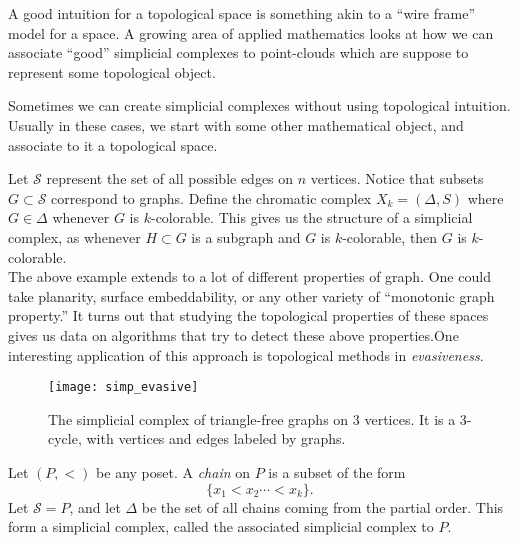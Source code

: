 A good intuition for a topological space is something akin to a ``wire frame'' model for a space. A growing area of applied mathematics looks at how we can associate ``good'' simplicial complexes to point-clouds which are suppose to represent some topological object. 

 Sometimes we can create simplicial complexes without using topological intuition. Usually in these cases, we start with some other mathematical object, and associate to it a topological space. 
\begin{example} Let $\mathcal S$ represent the set of all possible edges on $n$ vertices. Notice that subsets $G\subset \mathcal S$ correspond to graphs. Define the chromatic complex $X_k=(\Delta, S)$ where $G\in \Delta$ whenever $G$ is $k$-colorable. This gives us the structure of a simplicial complex, as whenever $H\subset G$ is a subgraph and $G$ is $k$-colorable, then $G$ is $k$-colorable. \\ The above example extends to a lot of different properties of graph. One could take planarity, surface embeddability, or any other variety of ``monotonic graph property.'' It turns out that studying the topological properties of these spaces gives us data on algorithms that try to detect these above properties.\project One interesting application of this approach is topological methods in \emph{evasiveness}.
\end{example}
\begin{figure}
\centering

\texttt{[image: simp\_evasive]}

\caption{The simplicial complex of triangle-free graphs on $3$ vertices. It is a 3-cycle, with vertices and edges labeled by graphs. }
\end{figure}
\begin{example}
Let $(P, <)$ be any poset. A \emph{chain} on $P$ is a subset of the form 
\[\{x_1< x_2\cdots < x_k\}.\]
Let $\mathcal S=P$, and let $\Delta$ be the set of all chains coming from the partial order. This form a simplicial complex, called the associated simplicial complex to $P$. 
\end{example}



